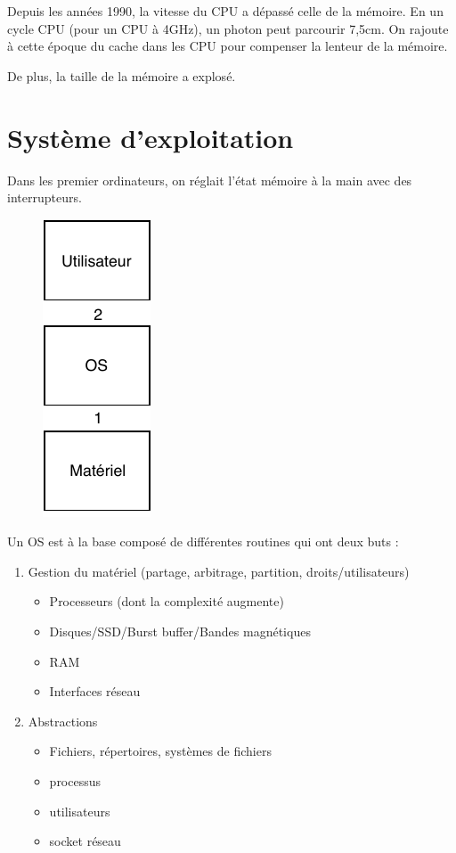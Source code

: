 \documentclass[11pt]{article}
\begin{document}
Depuis les années 1990, la vitesse du CPU a dépassé celle de la mémoire. En un cycle CPU (pour un CPU à 4GHz), un photon peut parcourir 7,5cm. On rajoute à cette époque du cache dans les CPU pour compenser la lenteur de la mémoire.

De plus, la taille de la mémoire a explosé.

\section{Système d'exploitation}
Dans les premier ordinateurs, on réglait l'état mémoire à la main avec des interrupteurs.

\begin{figure}
	\centering
	\includegraphics{img/hw-os-user.pdf}
\end{figure}

Un OS est à la base composé de différentes routines qui ont deux buts :
\begin{enumerate}
	\item Gestion du matériel (partage, arbitrage, partition, droits/utilisateurs) \begin{itemize}
		      \item Processeurs (dont la complexité augmente)
		      \item Disques/SSD/Burst buffer/Bandes magnétiques
		      \item RAM
		      \item Interfaces réseau
	      \end{itemize}
	\item Abstractions
	      \begin{itemize}
		      \item Fichiers, répertoires, systèmes de fichiers
		      \item processus
		      \item utilisateurs
		      \item socket réseau
	      \end{itemize}
\end{enumerate}
\end{document}
